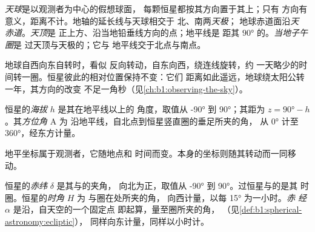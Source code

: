 \begin{definition}[天球]\label{def:b1:spherical-astronomy:celestial-sphere}
\emph{天球}是以观测者为中心的假想球面，
每颗恒星都按其方向置于其上；只有
方向有意义，距离不计。地轴的延长线与天球相交于
北、南两\emph{天极}；
地球赤道面沿\emph{天
赤道}。\emph{天顶}是
正上方、沿当地铅垂线方向的点；地平线是
距其 $\ang{90}$ 的。\emph{当地子午圈}是
过天顶与天极的；它与
地平线交于北点与南点。
\end{definition}

地球自西向东自转时，看似
反向转动，自东向西，绕连线旋转，约
一天略少的时间转一圈。恒星彼此的相对位置保持不变：它们
距离如此遥远，地球绕太阳公转一年，其方向的改变
不足一角秒（见\cref{ch:b1:observing-the-sky}）。

\begin{definition}[地平坐标]\label{def:b1:spherical-astronomy:horizontal}
恒星的\emph{海拔} $h$ 是其在地平线以上的
角度，取值从 \ang{-90} 到 \ang{90}；其距为
$z = \ang{90} - h$。其\emph{方位角} $\mathrm{A}$ 为
沿地平线，自北点到恒星竖直圈的垂足所夹的角，
从 \ang{0} 计至 \ang{360}，经东方计量。
\end{definition}

地平坐标属于观测者，它随地点和
时间而变。本身的坐标则随其转动而一同移动。

\begin{definition}[赤道坐标]\label{def:b1:spherical-astronomy:equatorial}
恒星的\emph{赤纬} $\delta$ 是其与的夹角，
向北为正，取值从 \ang{-90}
到 \ang{90}。过恒星与的是其
时圈。恒星的\emph{时角} $H$ 为
与圈在处所夹的角，
向西计量，以每 \ang{15} 为一小时。\emph{赤
经} $\alpha$ 是沿，自天空的一个固定点
即起算，量至圈所夹的角，
（见\cref{def:b1:spherical-astronomy:ecliptic}），
同样向东计量，同样以小时计。
\end{definition}

